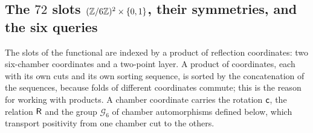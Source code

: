 \subsection{The \texorpdfstring{$72$}{72} slots \texorpdfstring{$(\mathbb Z/6\mathbb Z)^2\times\{0,1\}$}{(Z/6Z)\textasciicircum 2 x \{0,1\}}, their symmetries, and the six queries}\label{subsec:slot-array}

The slots of the functional are indexed by a product of reflection
coordinates: two six-chamber coordinates and a two-point layer. A product of
coordinates, each with its own cuts and its own sorting sequence, is sorted by
the concatenation of the sequences, because folds of different coordinates
commute; this is the reason for working with products. A chamber coordinate
carries the rotation $\mathsf c$, the relation $\mathsf R$ and the group $\mathcal G_6$ of chamber automorphisms defined below, which transport
positivity from one chamber cut to the others.

